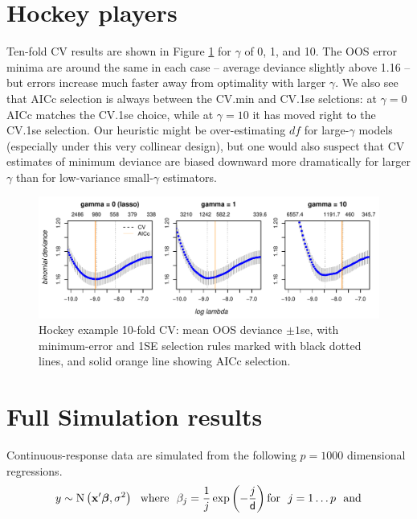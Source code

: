 \documentclass[12pt]{article}
\newcommand{\bs}[1]{\boldsymbol{#1}}
\newcommand{\mr}[1]{\mathrm{#1}}
\newcommand{\bm}[1]{\mathbf{#1}}
\begin{document}
\section{Hockey players}

Ten-fold CV results are shown in Figure
\ref{nhlcv} for $\gamma$ of 0, 1, and 10.  The OOS error minima are around the
same in each case -- average deviance slightly above 1.16 -- but errors
increase much faster away from optimality with larger $\gamma$.   We also see
that AICc selection is always between the CV.min and CV.1se selctions:  at
$\gamma=0$ AICc matches the CV.1se choice, while at $\gamma=10$ it has moved
right to the CV.1se  selection.  Our heuristic might be
over-estimating $df$ for large-$\gamma$ models (especially under this very
collinear design), but one would also suspect that CV estimates of minimum
deviance are biased downward more dramatically for larger $\gamma$ than for
low-variance small-$\gamma$ estimators.


\begin{figure}[h!]
\includegraphics[width=\textwidth]{graphs/nhl_cv}
\caption{\label{nhlcv} Hockey example 10-fold CV: mean OOS deviance $\pm 1$se, with minimum-error and 1SE selection rules marked with black dotted lines, and solid orange line showing AICc selection. }
\end{figure}


\section{Full Simulation results}

Continuous-response data are simulated from
 the following $p=1000$ dimensional regressions.
\begin{align}
\label{simdgp-both}
y &\sim \mr{N}\left(\bm{x}'\bs{\beta},\sigma^2\right) ~~\text{where}~~
\beta_j = \frac{1}{j}\exp\left(-\frac{j}{{\sf d}} \right)\text{for}~~j=1\dots p~~\text{and}\\
\end{align}
\end{document}
